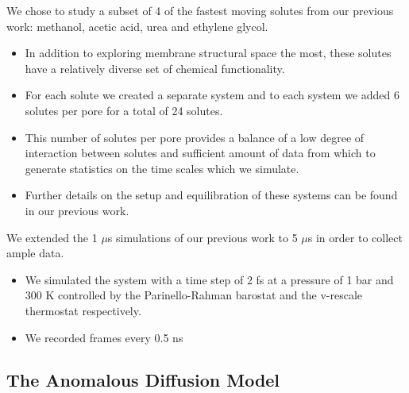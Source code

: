 \documentclass{article}
\begin{document}
  We chose to study a subset of 4 of the fastest moving solutes from our previous
  work: methanol, acetic acid, urea and ethylene glycol.
  \begin{itemize} 
    \item In addition to exploring membrane structural space the most, these solutes
    have a relatively diverse set of chemical functionality.   
    \item For each solute we created a separate system and to each system we
    added 6 solutes per pore for a total of 24 solutes.
    \item This number of solutes per pore provides a balance of a low 
    degree of interaction between solutes and sufficient amount of data from
    which to generate statistics on the time scales which we simulate.
    \item Further details on the setup and equilibration of these systems can
    be found in our previous work.\cite{coscia_chemically_2019}
  \end{itemize}
  
  \noindent We extended the 1 $\mu$s simulations of our previous work to 5 $\mu$s in order
  to collect ample data.
  \begin{itemize}
    \item We simulated the system with a time step of 2 fs at a pressure of 1 bar
    and 300 K controlled by the Parinello-Rahman barostat and the v-rescale thermostat
    respectively.
    \item We recorded frames every 0.5 ns
  \end{itemize}

  \subsection{The Anomalous Diffusion Model}\label{method:model_sFBM}
\end{document}

